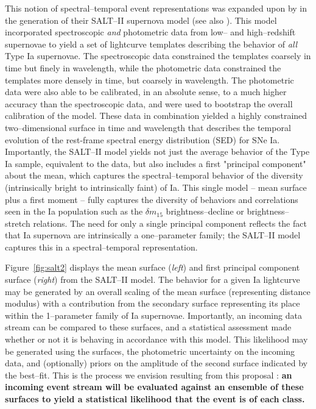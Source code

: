 This notion of spectral--temporal event representations was expanded upon  by
\cite{2007A&A...466...11G} in the generation of their SALT--II supernova model
(see also \cite{2007ApJ...663.1187H}).  This model incorporated spectroscopic
{\it and} photometric data from low-- and high--redshift supernovae to yield a
set of lightcurve templates describing the behavior of {\it all} Type Ia
supernovae. The spectroscopic data constrained the templates coarsely in time
but finely in wavelength, while the photometric data constrained the templates
more densely in time, but coarsely in wavelength.  The photometric data were
also able to be calibrated, in an absolute sense, to a much higher accuracy than
the spectroscopic data, and were used to bootstrap the overall calibration of
the model.  These data in combination yielded a highly constrained
two--dimensional surface in time and wavelength that describes the temporal
evolution of the rest-frame spectral energy distribution (SED) for SNe Ia.
Importantly, the SALT--II model yields not just the average behavior of the Type
Ia sample, equivalent to the \cite{2002PASP..114..803N} data, but also includes
a first "principal component" about the mean, which captures the
spectral--temporal behavior of the diversity (intrinsically bright to
intrinsically faint) of Ia. This single model -- mean surface plus a first
moment -- fully captures the diversity of behaviors and correlations seen in the
Ia population such as the $\delta m_{15}$ brightness--decline
\cite{1993ApJ...413L.105P} or brightness--stretch \citep{1998AJ....116.1009R}
relations.  The need for only a single principal component reflects the fact
that Ia supernova are intrinsically a one--parameter family; the SALT--II model
captures this in a spectral--temporal representation.

Figure~\ref{fig:salt2} displays the mean surface ({\it left}) and first
principal component surface ({\it right}) from the SALT--II model.  The behavior
for a given Ia lightcurve may be generated by an overall scaling of the mean
surface (representing distance modulus) with a contribution from the secondary
surface representing its place within the 1--parameter family of Ia supernovae.
Importantly, an incoming data stream can be compared to these surfaces, and a
statistical assessment made whether or not it is behaving in accordance with
this model.  This likelihood may be generated using the surfaces, the
photometric uncertainty on the incoming data, and (optionally) priors on the
amplitude of the second surface indicated by the best--fit.  This is the process
we envision resulting from this proposal : {\bf an incoming event stream will be
evaluated against an ensemble of these surfaces to yield a statistical
likelihood that the event is of each class.}


